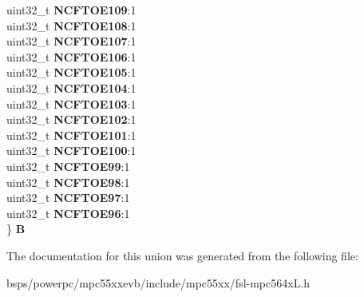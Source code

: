 \begin{DoxyCompactItemize}
\begin{tabbing}
\>uint32\_t {\bfseries NCFTOE109}:1\\
\>uint32\_t {\bfseries NCFTOE108}:1\\
\>uint32\_t {\bfseries NCFTOE107}:1\\
\>uint32\_t {\bfseries NCFTOE106}:1\\
\>uint32\_t {\bfseries NCFTOE105}:1\\
\>uint32\_t {\bfseries NCFTOE104}:1\\
\>uint32\_t {\bfseries NCFTOE103}:1\\
\>uint32\_t {\bfseries NCFTOE102}:1\\
\>uint32\_t {\bfseries NCFTOE101}:1\\
\>uint32\_t {\bfseries NCFTOE100}:1\\
\>uint32\_t {\bfseries NCFTOE99}:1\\
\>uint32\_t {\bfseries NCFTOE98}:1\\
\>uint32\_t {\bfseries NCFTOE97}:1\\
\>uint32\_t {\bfseries NCFTOE96}:1\\
\} {\bfseries B}\\

\end{tabbing}\end{DoxyCompactItemize}


The documentation for this union was generated from the following file\+:\begin{DoxyCompactItemize}
\item 
bsps/powerpc/mpc55xxevb/include/mpc55xx/fsl-\/mpc564x\+L.\+h\end{DoxyCompactItemize}
